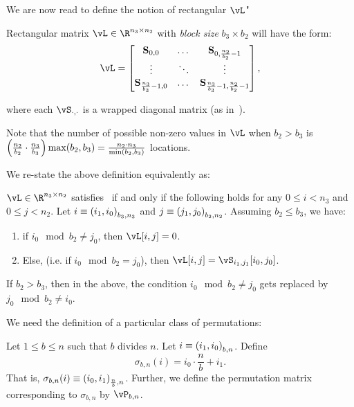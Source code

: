 We are now read to define the notion of rectangular $\vL$"
\begin{definition}\label{def:rect-Matrix L}
Rectangular matrix $\vL\in\R^{n_3\times n_2}$ with {\em block size} $b_3 \times b_2$ will have the form: 
    \begin{equation}
        	\label{eq:rect-def-L}
    \vL=
    	\begin{bmatrix}
    		\mx{S}_{0,0} & \dots & \mx{S}_{0,\frac{n_2}{b_2} -1} \\
    		\vdots & \ddots & \vdots \\
    		\mx{S}_{\frac{n_3}{b_3} -1,0} & \dots & \mx{S}_{\frac{n_3}{b_3} -1,\frac{n_2}{b_2} -1}
    	\end{bmatrix},
    \end{equation}
    
where each $\vS_{\cdot,\cdot}$ is a wrapped diagonal matrix (as in~).
\end{definition}
Note that the number of possible non-zero values in $\vL$ when $b_2 > b_3$ is $\left( {\frac {n_2}{b_2}\cdot \frac{n_3}{b_3}}\right) \max(b_2,b_3)=\frac{n_2 \cdot n_3}{\min(b_2,b_3)}$ locations. 


We re-state the above definition equivalently as:


\begin{proposition}
\label{prop:rect-L-eqv-def}
$\vL\in\R^{n_3\times n_2}$ satisfies~ if and only if the following holds for any
$0\le i < n_3$ and $0 \le j< n_2$. Let $i\equiv\left( {{i_1},{i_0}}\right)_{{b_3,n_3}}$ and $j\equiv\left( {{j_1},{j_0}}\right)_{{b_2,n_2}}$.  Assuming $b_2 \le b_3$, we have:
\begin{enumerate}
    \item\label{item:rect-zero-loc-L} if $i_0\mod{b_2}\ne j_0$, then $\vL[i,j]=0$. 
    \item \label{item:rect-non-zero-loc-L} Else, (i.e. if $i_0\mod{b_2}=j_0$), then $\vL[i,j]=\vS_{i_1,j_1}[i_0,j_0]$.
\end{enumerate}
If $b_2>b_3$, then in the above, the condition $i_0\mod{b_2}\ne j_0$ gets replaced by $j_0\mod{b_2}\ne i_0$.
\end{proposition}

We need the definition of a particular class of permutations:
\begin{definition}
\label{def:rect-sigma-b}
Let $1\le b\le n$ such that $b$ divides $n$.  Let $i\equiv\left( {{i_1},{i_0}}\right)_{{b,n}}$. Define
    \begin{equation}
            \label{eq:rect-sigma_b-def}
        \sigma_{b,n}(i) = i_0\cdot\frac{n}{b} + i_1.
    \end{equation}
That is, $\sigma_{b,n}(i)\equiv \left( {{i_0},{i_1}}\right)_{{\frac {n}{b} , n}}$. Further, we define the permutation matrix corresponding to $\sigma_{b,n}$ by $\vP_{b,n}$.
\end{definition}

